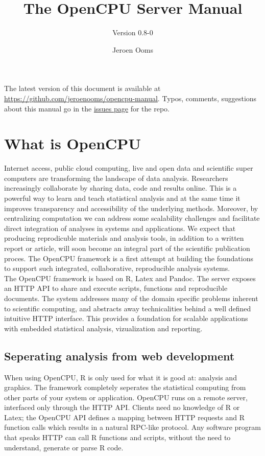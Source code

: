 \documentclass{scrartcl}\usepackage[]{graphicx}\usepackage[]{color}
\title{The OpenCPU Server Manual}
\subtitle{Version 0.8-0}
\author{Jeroen Ooms\vspace{-1ex}}
\date{}
\begin{document}
\maketitle

\noindent The latest version of this document is available at \href{https://github.com/jeroenooms/opencpu-manual}{https://github.com/jeroenooms/opencpu-manual}. Typos, comments, suggestions about this manual go in the \href{https://github.com/jeroenooms/opencpu-manual/issues}{issues page} for the repo. 

\tableofcontents

\section{What is OpenCPU}

Internet access, public cloud computing, live and open data and scientific super computers are transforming the landscape of data analysis. Researchers increasingly collaborate by sharing data, code and results online. This is a powerful way to learn and teach statistical analysis and at the same time it improves transparency and accessibility of the underlying methods. Moreover, by centralizing computation we can address some scalability challenges and facilitate direct integration of analyses in systems and applications. We expect that producing reprodicuble materials and analysis tools, in addition to a written report or article, will soon become an integral part of the scientific publication proces. The OpenCPU framework is a first attempt at building the foundations to support such integrated, collaborative, reproducible analysis systems. \\

The OpenCPU framework is based on R, Latex and Pandoc. The server exposes an HTTP API to share and execute scripts, functions and reproducible documents. The system addresses many of the domain specific problems inherent to scientific computing, and abstracts away technicalities behind a well defined intuitive HTTP interface. This provides a foundation for scalable applications with embedded statistical analysis, vizualization and reporting.

\subsection{Seperating analysis from web development}

When using OpenCPU, R is only used for what it is good at: analysis and graphics. The framework completely seperates the statistical computing from other parts of your system or application. OpenCPU runs on a remote server, interfaced only through the HTTP API. Clients need no knowledge of R or Latex; the OpenCPU API defines a mapping between HTTP requests and R function calls which results in a natural RPC-like protocol. Any software program that speaks HTTP can call R functions and scripts, without the need to understand, generate or parse R code.
\end{document}
